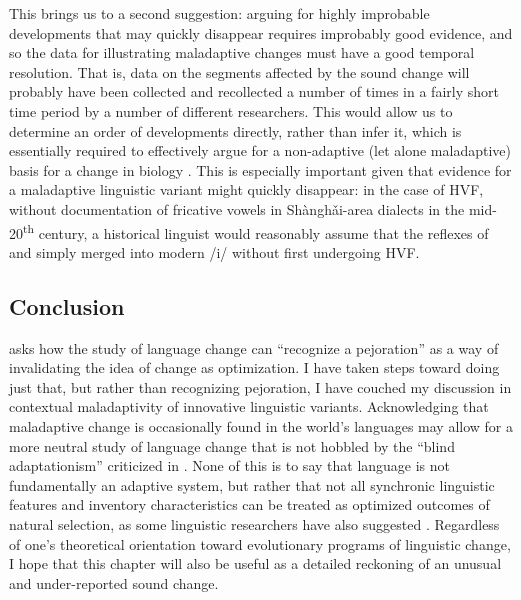 \documentclass[output=paper,hidelinks]{langscibook}
\begin{document}
This brings us to a second suggestion: arguing for highly improbable developments that may quickly disappear requires improbably good evidence, and so the data for illustrating maladaptive changes must have a good temporal resolution. That is, data on the segments affected by the sound change will probably have been collected and recollected a number of times in a fairly short time period by a number of different researchers. This would allow us to determine an order of developments directly, rather than infer it, which is essentially required to effectively argue for a non-adaptive (let alone maladaptive) basis for a change in biology \citep{gould, crespi}. This is especially important given that evidence for a maladaptive linguistic variant might quickly disappear: in the case of HVF, without documentation of fricative vowels in Sh\`{a}ngh\v{a}i-area dialects in the mid-20\textsuperscript{th} century, a historical linguist would reasonably assume that the reflexes of \pri{} and \prien{} simply merged into modern /i/ without \pri{} first undergoing HVF.

\subsection{Conclusion}

\citet{vennemann} asks how the study of language change can ``recognize a pejoration'' as a way of invalidating the idea of change as optimization. I have taken steps toward doing just that, but rather than recognizing pejoration, I have couched my discussion in  contextual maladaptivity of innovative linguistic variants. Acknowledging that maladaptive change is occasionally found in the world's languages may allow for a more neutral study of language change that is not hobbled by the ``blind adaptationism'' criticized in \citet{gould-lewontin}. None of this is to say that language is not fundamentally an adaptive system, but rather that not all synchronic linguistic features and inventory characteristics can be treated as optimized outcomes of natural selection, as some linguistic researchers have also suggested \citep{lindblom-1995}. Regardless of one's theoretical orientation toward evolutionary programs of linguistic change, I hope that this chapter will also be useful as a detailed reckoning of an unusual and under-reported sound change.

{\sloppy\printbibliography[heading=subbibliography,notkeyword=this]}
\end{document}
